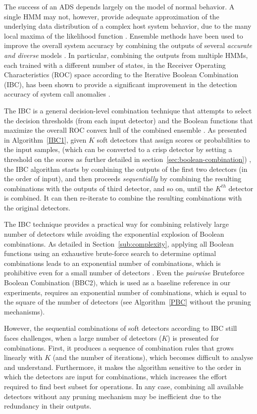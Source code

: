 The success of an ADS depends largely on the model of normal behavior.
A single HMM may not, however, provide adequate approximation of the underlying data distribution of a complex host system behavior, due to the many local maxima of the likelihood function \cite{Khreich2009-ICC}.
Ensemble methods have been used to improve the overall system accuracy by combining the outputs of several \textit{accurate and diverse} models \cite{Kittler1998,Dietterich2000,Kuncheva2004b,Zhou2012}.
In particular, combining the outputs from multiple HMMs, each trained with a different number of states, in the Receiver Operating Characteristics (ROC) space according to the Iterative Boolean Combination (IBC), has been shown to provide a significant improvement in the detection accuracy of system call anomalies \cite{Khreich2010-ICPR}.

The IBC is a general decision-level combination technique that attempts to select the decision thresholds (from each input detector) and the Boolean functions that maximize the overall ROC convex hull of the combined ensemble \cite{Khreich2010-ICPR}.
As presented in Algorithm~\ref{IBC1}, given $K$ soft detectors that assign scores or probabilities to the input samples, (which can be converted to a crisp detector by setting a threshold on the scores as further detailed in section~\ref{sec:boolean-combination}) , the IBC algorithm starts by combining the outputs of the first two detectors (in the order of input), and then proceeds \textit{sequentially} by combining the resulting combinations with the outputs of third detector, and so on, until the $K^{th}$ detector is combined.
It can then re-iterate to combine the resulting combinations with the original detectors.

The IBC technique provides a practical way for combining relatively large number of detectors while avoiding the exponential explosion of Boolean combinations.
As detailed in Section~\ref{sub:complexity}, applying all Boolean functions using an exhaustive brute-force search to determine optimal combinations leads to an exponential number of combinations, which is prohibitive even for a small number of detectors \cite{Barreno2008}.
Even the \textit{pairwise} Bruteforce Boolean Combination (BBC2), which is used as a baseline reference in our experiments, requires an exponential number of combinations, which is equal to the square of the number of detectors (see Algorithm~\ref{PBC} without the pruning mechanisms).

However, the sequential combinations of soft detectors according to IBC still faces challenges, when a large number of detectors ($K$) is presented for combinations.
First, it produces a sequence of combination rules that grows linearly with $K$ (and the number of iterations), which becomes difficult to analyse and understand.
Furthermore, it makes the algorithm sensitive to the order in which the detectors are input for combinations, which increases the effort required to find best subset for operations.
In any case, combining all available detectors without any pruning mechanism may be inefficient due to the redundancy in their outputs.

